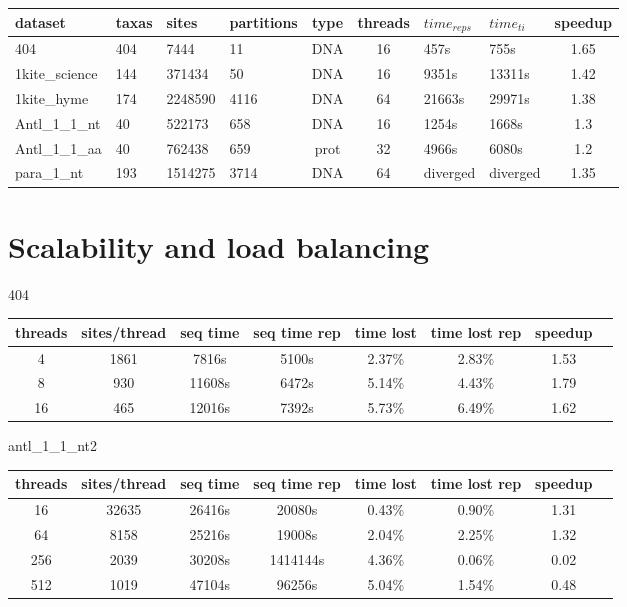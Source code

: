 \documentclass[a4paper]{article}
\begin{document}
\begin{tabular}{|l|l|l|l|c|c|l|l|c|}
\hline dataset                    & taxas & sites    & partitions & type & threads & $time_{reps}$ & $time_{ti}$ & speedup\\
\hline 404                        & 404   &  7444    & 11         & DNA  & 16 & 457s     &  755s     & 1.65  \\
\hline 1kite\_science             & 144   &  371434  & 50         & DNA  & 16 & 9351s    &  13311s   & 1.42  \\
\hline 1kite\_hyme                & 174   &  2248590 & 4116       & DNA  & 64 & 21663s   &  29971s   & 1.38 \\
\hline Antl\_1\_1\_nt             & 40    &  522173  & 658        & DNA  & 16 & 1254s    &  1668s    & 1.3  \\
\hline Antl\_1\_1\_aa             & 40    &  762438  & 659        & prot & 32 & 4966s    &  6080s    & 1.2\\
\hline para\_1\_nt                & 193   &  1514275 & 3714       & DNA  & 64 & diverged &  diverged & 1.35  \\
\hline 
\end{tabular}\newline
\newline


\section{Scalability and load balancing}
404

\begin{tabular}{|c|c|c|c|c|c|c|c|}
\hline threads & sites/thread & seq time & seq time rep & time lost & time lost rep & speedup \\
\hline 4 & 1861 & 7816s & 5100s & 2.37\% & 2.83\% & 1.53 \\
\hline 8 & 930 & 11608s & 6472s & 5.14\% & 4.43\% & 1.79 \\
\hline 16 & 465 & 12016s & 7392s & 5.73\% & 6.49\% & 1.62 \\
\hline
\end{tabular}
\newline

antl\_1\_1\_nt2

\begin{tabular}{|c|c|c|c|c|c|c|c|}
\hline threads & sites/thread & seq time & seq time rep & time lost & time lost rep & speedup \\
\hline 16 & 32635 & 26416s & 20080s & 0.43\% & 0.90\% & 1.31 \\
\hline 64 & 8158 & 25216s & 19008s & 2.04\% & 2.25\% & 1.32 \\
\hline 256 & 2039 & 30208s & 1414144s & 4.36\% & 0.06\% & 0.02 \\
\hline 512 & 1019 & 47104s & 96256s & 5.04\% & 1.54\% & 0.48 \\
\hline
\end{tabular}
\newline
\end{document}
